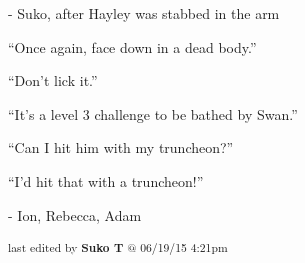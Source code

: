                                 - Suko, after Hayley was stabbed in the arm



``Once again, face down in a dead body.''

``Don't lick it.''




``It's a level 3 challenge to be bathed by Swan.''

``Can I hit him with my truncheon?''

``I'd hit that with a truncheon!''

                                - Ion, Rebecca, Adam


\iffalse

======================
THESE ARE ERRORS ENCOUNTERED DURING THE EXPORT PROCESS
======================

	Unable to highlight for footnote: Thanks!, unable to correctly match (exceeded acceptable limit):Expected[Challenge: Avoid taking stray fire or being spotted 1.  Overcome.]


\fi

\vspace{\fill}

\begin{flushright}
\textsubscript{last edited by \textbf{Suko T} @ 06/19/15 4:21pm}
\end{flushright}

